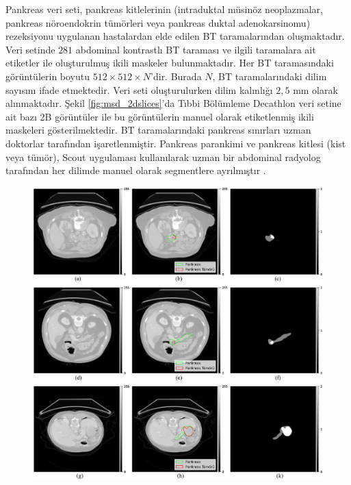Pankreas veri seti, pankreas kitlelerinin (intraduktal müsinöz neoplazmalar, pankreas nöroendokrin tümörleri veya pankreas duktal adenokarsinomu) rezeksiyonu uygulanan hastalardan elde edilen BT taramalarından oluşmaktadır. Veri setinde $281$ abdominal kontrastlı BT taraması ve ilgili taramalara ait etiketler ile oluşturulmuş ikili maskeler bulunmaktadır. Her BT taramasındaki görüntülerin boyutu $512 \times 512 \times N$’dir. Burada $N$, BT taramalarındaki dilim sayısını ifade etmektedir. Veri seti oluşturulurken dilim kalınlığı $2,5$ mm olarak alınmaktadır. Şekil \ref{fig:msd_2dslices}’da Tıbbi Bölümleme Decathlon veri setine ait bazı 2B görüntüler ile bu görüntülerin manuel olarak etiketlenmiş ikili maskeleri gösterilmektedir. BT taramalarındaki pankreas sınırları uzman doktorlar tarafından işaretlenmiştir. Pankreas parankimi ve pankreas kitlesi (kist veya tümör), Scout uygulaması kullanılarak uzman bir abdominal radyolog tarafından her dilimde manuel olarak segmentlere ayrılmıştır \cite{hulovatyy2016scout}.

\begin{figure}[h!]
	\begin{center}
		\vspace{0.4cm}
		{
			\vspace{0.4cm}
			\includegraphics[scale=0.42]{Yapilan-Calismalar/Figures/msd_2dslices.pdf}
		}
	\end{center}
\end{figure} 

